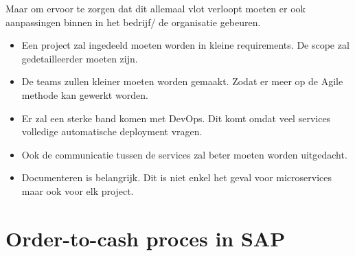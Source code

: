 Maar om ervoor te zorgen dat dit allemaal vlot verloopt moeten er ook aanpassingen binnen in het bedrijf/ de organisatie gebeuren. 
\begin{itemize}
	\item Een project zal ingedeeld moeten worden in kleine requirements. De scope zal gedetailleerder moeten zijn.
	\item De teams zullen kleiner moeten worden gemaakt. Zodat er meer op de Agile methode kan gewerkt worden. 
	\item Er zal een sterke band komen met DevOps. Dit komt omdat veel services volledige automatische deployment vragen.
	\item Ook de communicatie tussen de services zal beter moeten worden uitgedacht.
	\item Documenteren is belangrijk. Dit is niet enkel het geval voor microservices maar ook voor elk project.
\end{itemize}

\section{Order-to-cash proces in SAP}
